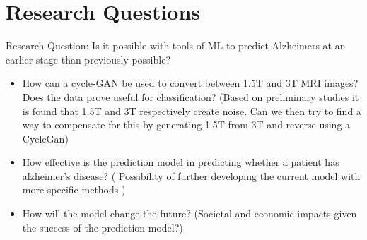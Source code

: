 \documentclass[]{article}
\begin{document}
\section{Research Questions}
Research Question: Is it possible with tools of ML to predict Alzheimers at an earlier stage than previously possible?
\begin{itemize}
	\item How can a cycle-GAN be used to convert between 1.5T and 3T MRI images? Does the data prove useful for classification? (Based on preliminary studies it is found that 1.5T and 3T respectively create noise. Can we then try to find a way to compensate for this by generating 1.5T from 3T and reverse using a CycleGan)
	\item How effective is the prediction model in predicting whether a patient has alzheimer's disease? ( Possibility of further developing the current model with more specific methods )
	\item How will the model change the future? (Societal and economic impacts given the success of the prediction model?)
\end{itemize}
\end{document}
